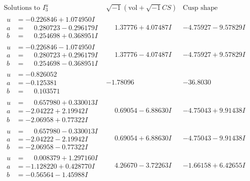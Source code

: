 \documentclass[1p]{elsarticle_modified}
\theoremstyle{definition}
\newcommand{\I}{\sqrt{-1}}
\begin{document}
$$\begin{array}{c|c|c}  
\text{Solutions to }I^u_{3}& \I (\text{vol} + \sqrt{-1}CS) & \text{Cusp shape}\\
 \hline 
\begin{aligned}
u &= -0.226846 + 1.074950 I \\
a &= \phantom{-}0.280723 - 0.296179 I \\
b &= \phantom{-}0.254698 + 0.368951 I\end{aligned}
 & \phantom{-}1.37776 + 4.07487 I & -4.75927 - 9.57829 I \\ \hline\begin{aligned}
u &= -0.226846 - 1.074950 I \\
a &= \phantom{-}0.280723 + 0.296179 I \\
b &= \phantom{-}0.254698 - 0.368951 I\end{aligned}
 & \phantom{-}1.37776 - 4.07487 I & -4.75927 + 9.57829 I \\ \hline\begin{aligned}
u &= -0.826052\phantom{ +0.000000I} \\
a &= -0.125381\phantom{ +0.000000I} \\
b &= \phantom{-}0.103571\phantom{ +0.000000I}\end{aligned}
 & -1.78096\phantom{ +0.000000I} & -36.8030\phantom{ +0.000000I} \\ \hline\begin{aligned}
u &= \phantom{-}0.657980 + 0.330013 I \\
a &= -2.04222 + 2.19942 I \\
b &= -2.06958 + 0.77322 I\end{aligned}
 & \phantom{-}0.69054 - 6.88630 I & -4.75043 + 9.91438 I \\ \hline\begin{aligned}
u &= \phantom{-}0.657980 - 0.330013 I \\
a &= -2.04222 - 2.19942 I \\
b &= -2.06958 - 0.77322 I\end{aligned}
 & \phantom{-}0.69054 + 6.88630 I & -4.75043 - 9.91438 I \\ \hline\begin{aligned}
u &= \phantom{-}0.008379 + 1.297160 I \\
a &= -1.128220 + 0.428770 I \\
b &= -0.56564 - 1.45988 I\end{aligned}
 & \phantom{-}4.26670 - 3.72263 I & -1.66158 + 6.42655 I \\ \hline\begin{aligned}

\end{aligned}
\end{array}$$
\end{document}
